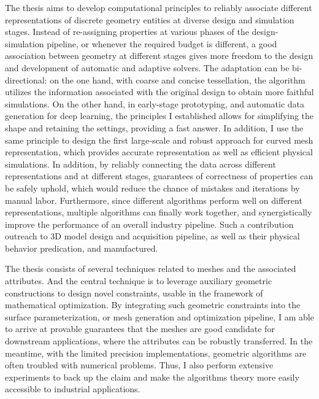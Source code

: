 The thesis aims to develop computational principles to reliably associate different representations of discrete geometry entities at diverse design and simulation stages. Instead of re-assigning properties at various phases of the design-simulation pipeline, or whenever the required budget is different, a good association between geometry at different stages gives more freedom to the design and development of automatic and adaptive solvers. The adaptation can be bi-directional: on the one hand, with coarse and concise tessellation, the algorithm utilizes the information associated with the original design to obtain more faithful simulations. On the other hand, in early-stage prototyping, and automatic data generation for deep learning, the principles I established allows for simplifying the shape and retaining the settings, providing a fast answer. In addition, I use the same principle to design the first large-scale and robust approach for curved mesh representation, which provides accurate representation as well as efficient physical simulations.
In addition, by reliably connecting the data across different representations and at different stages, guarantees of correctness of properties can be safely uphold, which would reduce the chance of mistakes and iterations by manual labor. 
Furthermore,  since different algorithms perform well on different representations, multiple algorithms can finally work together, and synergistically improve the performance of an overall industry pipeline.
Such a contribution outreach to 3D model design and acquisition pipeline, as well as their physical behavior predication, and manufactured.

The thesis consists of several techniques related to meshes and the associated attributes.
And the central technique is to leverage auxiliary geometric constructions to design novel constraints, usable in the framework of mathematical optimization. 
By integrating such geometric constraints into the surface parameterization, or mesh generation and optimization pipeline, I am able to arrive at provable guarantees that the meshes are good candidate for downstream applications, where the attributes can be robustly transferred.
In the meantime, with the limited precision implementations, geometric algorithms are often troubled with numerical problems. Thus, I also perform extensive experiments to back up the claim and make the algorithms theory more easily accessible to industrial applications.

